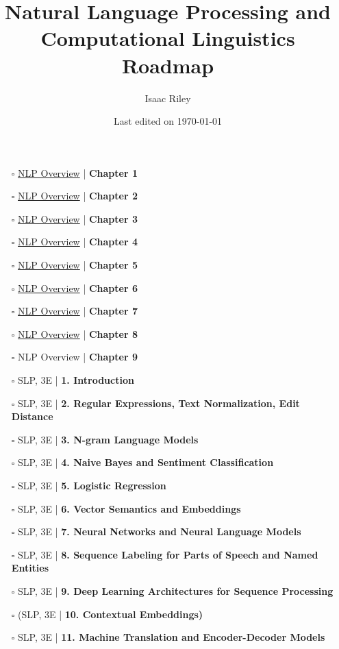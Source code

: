 \documentclass[a4, landscape, 12pt]{article}
\title{Natural Language Processing and Computational Linguistics Roadmap}
\author{Isaac Riley}
\date{Last edited on \today}
\newcommand{\checkbox}{$\square$}%
\begin{document}
\maketitle
\begin{itemize}
\item [\checkbox]  \href{https://nlpoverview.com/}{NLP Overview} | \textbf{ Chapter 1
}
\item [\checkbox]  \href{https://nlpoverview.com/}{NLP Overview} | \textbf{ Chapter 2
}
\item [\checkbox]  \href{https://nlpoverview.com/}{NLP Overview} | \textbf{ Chapter 3
}
\item [\checkbox]  \href{https://nlpoverview.com/}{NLP Overview} | \textbf{ Chapter 4
}
\item [\checkbox]  \href{https://nlpoverview.com/}{NLP Overview} | \textbf{ Chapter 5
}
\item [\checkbox]  \href{https://nlpoverview.com/}{NLP Overview} | \textbf{ Chapter 6
}
\item [\checkbox]  \href{https://nlpoverview.com/}{NLP Overview} | \textbf{ Chapter 7
}
\item [\checkbox]  \href{https://nlpoverview.com/}{NLP Overview} | \textbf{ Chapter 8
}
\item [\checkbox]  NLP Overview | \textbf{ Chapter 9
}
\item [\checkbox]  SLP, 3E | \textbf{ 1. Introduction
}
\item [\checkbox]  SLP, 3E | \textbf{ 2. Regular Expressions, Text Normalization, Edit Distance
}
\item [\checkbox]  SLP, 3E | \textbf{ 3. N-gram Language Models
}
\item [\checkbox]  SLP, 3E | \textbf{ 4. Naive Bayes and Sentiment Classification
}
\item [\checkbox]  SLP, 3E | \textbf{ 5. Logistic Regression
}
\item [\checkbox]  SLP, 3E | \textbf{ 6. Vector Semantics and Embeddings
}
\item [\checkbox]  SLP, 3E | \textbf{ 7. Neural Networks and Neural Language Models
}
\item [\checkbox]  SLP, 3E | \textbf{ 8. Sequence Labeling for Parts of Speech and Named Entities
}
\item [\checkbox]  SLP, 3E | \textbf{ 9. Deep Learning Architectures for Sequence Processing
}
\item [\checkbox]  (SLP, 3E | \textbf{ 10. Contextual Embeddings)
}
\item [\checkbox]  SLP, 3E | \textbf{ 11. Machine Translation and Encoder-Decoder Models
}
\end{itemize}
\end{document}
